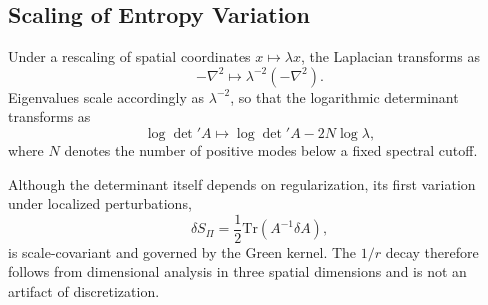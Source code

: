 \subsection{Scaling of Entropy Variation}
  \label{subsec:scaling-of-entropy-variation}

  Under a rescaling of spatial coordinates
  $x \mapsto \lambda x$,
  the Laplacian transforms as
  \begin{equation}
    -\nabla^2 \mapsto \lambda^{-2} (-\nabla^2).
  \end{equation}
  Eigenvalues scale accordingly as $\lambda^{-2}$,
  so that the logarithmic determinant transforms as
  \begin{equation}
    \log \det{}' A \mapsto
    \log \det{}' A - 2 N \log \lambda,
  \end{equation}
  where $N$ denotes the number of positive modes
  below a fixed spectral cutoff.

  Although the determinant itself depends on regularization,
  its first variation under localized perturbations,
  \begin{equation}
    \delta S_\Pi = \frac12 \mathrm{Tr}(A^{-1}\delta A),
  \end{equation}
  is scale-covariant and governed by the Green kernel.
  The $1/r$ decay therefore follows from dimensional analysis
  in three spatial dimensions and is not an artifact of discretization.
